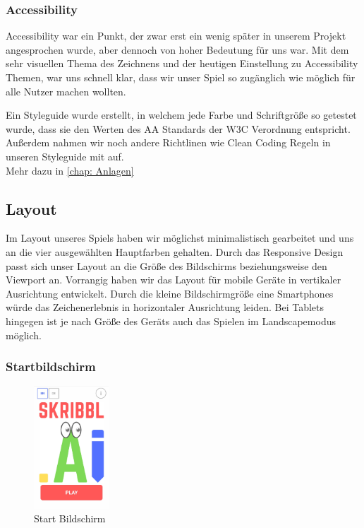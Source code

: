 \documentclass[11pt]{article}
\begin{document}
\subsubsection{Accessibility}

Accessibility war ein Punkt, der zwar erst ein wenig später in unserem Projekt angesprochen wurde, aber dennoch von hoher Bedeutung für uns war. Mit dem sehr visuellen Thema des Zeichnens und der heutigen Einstellung zu Accessibility Themen, war uns schnell klar, dass wir unser Spiel so zugänglich wie möglich für alle Nutzer machen wollten.

Ein Styleguide wurde erstellt, in welchem jede Farbe und Schriftgröße so getestet wurde, dass sie den Werten des AA Standards der W3C Verordnung entspricht. Außerdem nahmen wir noch andere Richtlinen wie Clean Coding Regeln in unseren Styleguide mit auf.\\
Mehr dazu in \autoref{chap: Anlagen} 

\subsection{Layout}
Im Layout unseres Spiels haben wir möglichst minimalistisch gearbeitet und uns an die vier ausgewählten Hauptfarben gehalten. Durch das Responsive Design passt sich unser Layout an die Größe des Bildschirms beziehungsweise den Viewport an. Vorrangig haben wir das Layout für mobile Geräte in vertikaler Ausrichtung entwickelt. Durch die kleine Bildschirmgröße eine Smartphones würde das Zeichenerlebnis in horizontaler Ausrichtung leiden. Bei Tablets hingegen ist je nach Größe des Geräts auch das Spielen im Landscapemodus möglich.

\subsubsection{Startbildschirm}

\begin{figure}
\centering
\includegraphics[width=0.25\textwidth]{images/Startscreen.jpg}
\caption{\label{fig:Startscreen}Start Bildschirm}
\end{figure}
\end{document}

